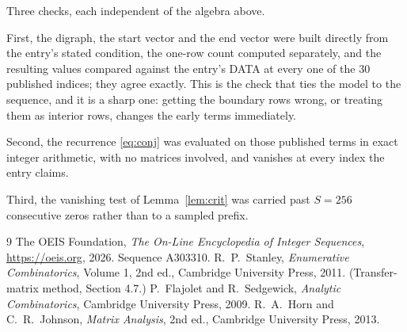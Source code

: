 \documentclass[11pt,a4paper]{article}
\theoremstyle{plain}
\theoremstyle{definition}
\begin{document}
Three checks, each independent of the algebra above.

First, the digraph, the start vector and the end vector were built directly from the
entry's stated condition, the one-row count computed separately, and the resulting values
compared against the entry's DATA at every one of the $30$ published indices; they
agree exactly. This is the check that ties the model to the sequence, and it is a sharp one:
getting the boundary rows wrong, or treating them as interior rows, changes the early terms
immediately.

Second, the recurrence \eqref{eq:conj} was evaluated on those published terms in exact
integer arithmetic, with no matrices involved, and vanishes at every index the entry claims.

Third, the vanishing test of Lemma~\ref{lem:crit} was carried past $S=256$ consecutive
zeros rather than to a sampled prefix.

\begin{thebibliography}{9}
 The OEIS Foundation, \emph{The On-Line Encyclopedia of Integer
Sequences}, \url{https://oeis.org}, 2026. Sequence A303310.
 R.~P.~Stanley, \emph{Enumerative Combinatorics}, Volume 1, 2nd ed.,
Cambridge University Press, 2011. (Transfer-matrix method, Section 4.7.)
 P.~Flajolet and R.~Sedgewick, \emph{Analytic Combinatorics}, Cambridge
University Press, 2009.
 R.~A.~Horn and C.~R.~Johnson, \emph{Matrix Analysis}, 2nd ed., Cambridge
University Press, 2013.
\end{thebibliography}
\end{document}
